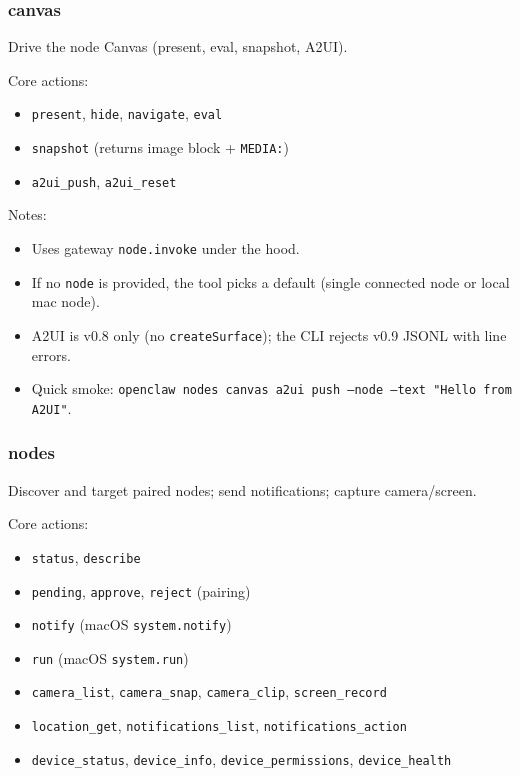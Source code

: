 \subsubsection{canvas}


Drive the node Canvas (present, eval, snapshot, A2UI).

Core actions:

\begin{itemize}
  \item \texttt{present}, \texttt{hide}, \texttt{navigate}, \texttt{eval}
  \item \texttt{snapshot} (returns image block + \texttt{MEDIA:})
  \item \texttt{a2ui\_push}, \texttt{a2ui\_reset}
\end{itemize}


Notes:

\begin{itemize}
  \item Uses gateway \texttt{node.invoke} under the hood.
  \item If no \texttt{node} is provided, the tool picks a default (single connected node or local mac node).
  \item A2UI is v0.8 only (no \texttt{createSurface}); the CLI rejects v0.9 JSONL with line errors.
  \item Quick smoke: \texttt{openclaw nodes canvas a2ui push --node  --text "Hello from A2UI"}.
\end{itemize}


\subsubsection{nodes}


Discover and target paired nodes; send notifications; capture camera/screen.

Core actions:

\begin{itemize}
  \item \texttt{status}, \texttt{describe}
  \item \texttt{pending}, \texttt{approve}, \texttt{reject} (pairing)
  \item \texttt{notify} (macOS \texttt{system.notify})
  \item \texttt{run} (macOS \texttt{system.run})
  \item \texttt{camera\_list}, \texttt{camera\_snap}, \texttt{camera\_clip}, \texttt{screen\_record}
  \item \texttt{location\_get}, \texttt{notifications\_list}, \texttt{notifications\_action}
  \item \texttt{device\_status}, \texttt{device\_info}, \texttt{device\_permissions}, \texttt{device\_health}
\end{itemize}


